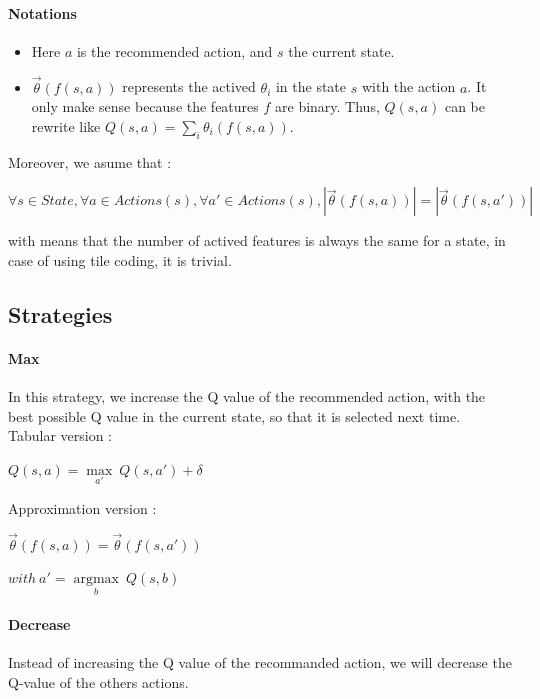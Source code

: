 \documentclass[a4paper,12pt]{article}
\begin{document}
      
      \paragraph{Notations}
      
\begin{itemize}
 \item Here $a$ is the recommended action, and $s$ the current state.
 \item $\vec\theta(f(s,a))$ represents the actived $\theta_i$ in 
      the state $s$ with the action $a$. It only make sense because the features $f$ are binary.
      Thus, $Q(s,a)$ can be rewrite like $Q(s,a) = \sum\limits_{i} \theta_{i}(f(s,a))$.
\end{itemize}

     
     Moreover, we asume that :
      \begin{center}
	$\forall s \in State, \forall a \in Actions(s), \forall a' \in Actions(s), |\vec\theta (f(s,a))| = | \vec\theta (f(s,a'))|$ 
      \end{center}
      with means that the number of actived features is always the same for a state, in case of using
      tile coding, it is trivial.
      

      
      \subsection{Strategies}
      
      \paragraph{Max} In this strategy, we increase the Q value of the recommended action, 
      with the best possible Q value in the current state, so that it is selected next time. 
      \newline
      Tabular version :
      \begin{center}
       $Q(s,a) = \underset{a'}{\operatorname{max}}\ Q(s,a') + \delta$
      \end{center}
      Approximation version :
      \begin{center}
	$\vec\theta(f(s,a)) = \vec\theta(f(s,a'))$
	
	$with\ a' = \underset{b}{\operatorname{argmax}}\ Q(s,b) $ 
	\end{center}
       
       \paragraph{Decrease} Instead of increasing the Q value of the recommanded action, we will decrease
       the Q-value of the others actions.
       
\end{document}
